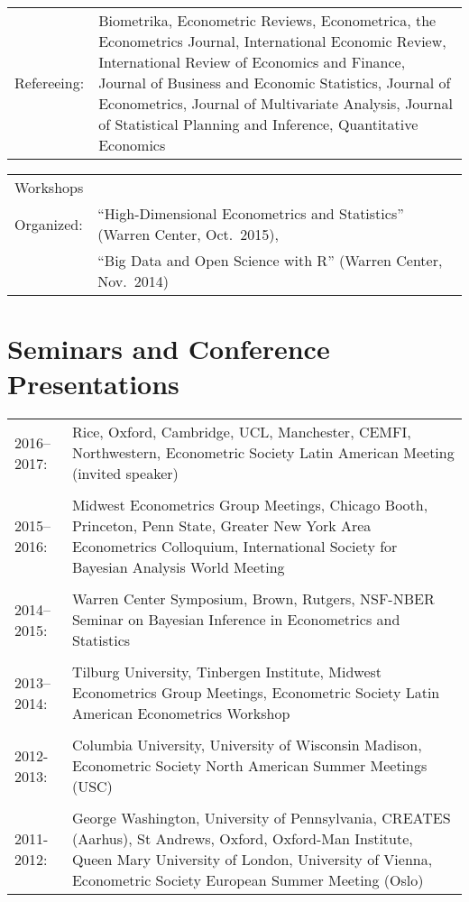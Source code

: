 \documentclass[line,overlapped]{myres}
\begin{document}
\begin{resume}
\begin{tabular}{p{2cm}p{12cm}}
Refereeing: & Biometrika, 
Econometric Reviews, 
Econometrica,
the Econometrics Journal, 
International Economic Review,  
International Review of Economics and Finance,
Journal of Business and Economic Statistics, 
Journal of Econometrics,
Journal of Multivariate Analysis,
Journal of Statistical Planning and Inference, 
Quantitative Economics

\end{tabular}


\begin{tabular}{p{2cm}p{12cm}}
Workshops \\Organized: &``High-Dimensional Econometrics and Statistics'' (Warren Center, Oct.\ 2015),\\
& ``Big Data and Open Science with R'' (Warren Center, Nov.\ 2014)
\end{tabular}


\section{\sc Seminars and Conference Presentations}
\vspace{1em}
\begin{tabular}{p{2cm}p{12cm}}
2016--2017: & Rice, Oxford, Cambridge, UCL, Manchester, CEMFI, Northwestern, Econometric Society Latin American Meeting (invited speaker)
\\
\\

2015--2016: & Midwest Econometrics Group Meetings, Chicago Booth, Princeton, Penn State, Greater New York Area Econometrics Colloquium, International Society for Bayesian Analysis World Meeting\\ \\
2014--2015: & Warren Center Symposium, Brown, Rutgers, NSF-NBER Seminar on Bayesian Inference in Econometrics and Statistics \\ \\
2013--2014: & Tilburg University, Tinbergen Institute, Midwest Econometrics Group Meetings, Econometric Society Latin American Econometrics Workshop\\ \\
2012-2013: & Columbia University, University of Wisconsin Madison, Econometric Society North American Summer Meetings (USC) \\\\
2011-2012: &  George Washington, University of Pennsylvania, CREATES (Aarhus), St Andrews, Oxford, Oxford-Man Institute, Queen Mary University of London, University of Vienna, Econometric Society European Summer Meeting (Oslo)

\end{tabular}



\end{resume}
\end{document}
